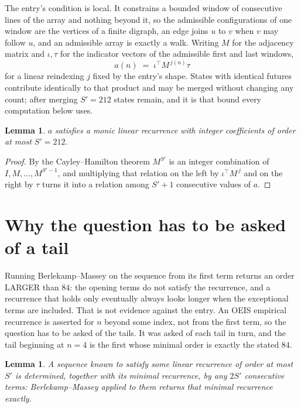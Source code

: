 \documentclass[11pt,a4paper]{article}
\theoremstyle{plain}
\newtheorem{lemma}[theorem]{Lemma}
\theoremstyle{definition}
\begin{document}
The entry's condition is local. It constrains a bounded window of consecutive lines of the
array and nothing beyond it, so the admissible configurations of one window are the vertices of
a finite digraph, an edge joins $u$ to $v$ when $v$ may follow $u$, and an admissible array is
exactly a walk. Writing $M$ for the adjacency matrix and $\iota,\tau$ for the indicator vectors
of the admissible first and last windows,
\[
a(n)\;=\;\iota^{\!\top}M^{\,j(n)}\tau
\]
for a linear reindexing $j$ fixed by the entry's shape. States with identical futures
contribute identically to that product and may be merged without changing any count; after
merging $S'=212$ states remain, and it is that bound every computation below uses.

\begin{lemma}\label{lem:cf}
$a$ satisfies a monic linear recurrence with integer coefficients of order at most $S'=212$.
\end{lemma}

\begin{proof}
By the Cayley--Hamilton theorem $M^{S'}$ is an integer combination of $I,M,\dots,M^{S'-1}$,
and multiplying that relation on the left by $\iota^{\!\top}M^{\,j}$ and on the right by
$\tau$ turns it into a relation among $S'+1$ consecutive values of $a$.
\end{proof}

\section{Why the question has to be asked of a tail}

Running Berlekamp--Massey on the sequence from its first term returns an order LARGER than $84$: the opening terms do not satisfy the recurrence, and a recurrence that holds only eventually always looks longer when the exceptional terms are included. That is not evidence against the entry. An OEIS empirical recurrence is asserted for $n$ beyond some index, not from the first term, so the question has to be asked of the tails. It was asked of each tail in turn, and the tail beginning at $n=4$ is the first whose minimal order is exactly the stated $84$.

\begin{lemma}\label{lem:bm}
A sequence known to satisfy some linear recurrence of order at most $S'$ is determined,
together with its minimal recurrence, by any $2S'$ consecutive terms: Berlekamp--Massey applied
to them returns that minimal recurrence exactly.
\end{lemma}
\end{document}
